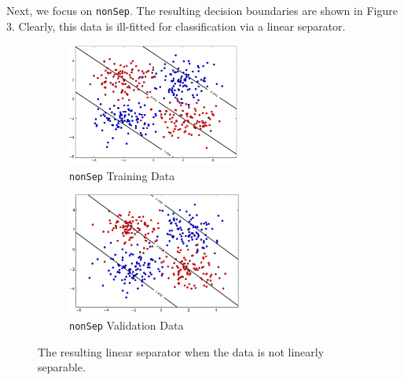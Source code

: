 \documentclass{sigchi}
\begin{document}
Next, we focus on \texttt{nonSep}. The resulting decision boundaries are shown in Figure 3. Clearly, this data is ill-fitted for classification via a linear separator.

\begin{figure}
\centering

\begin{subfigure}[b]{2.25in}
	\includegraphics[width = 2.25in]{plots/1-3/casey/nonSepc1train.png}
	\caption{\texttt{nonSep} Training Data}
\end{subfigure}

\begin{subfigure}[b]{2.25in}
	\includegraphics[width = 2.25in]{plots/1-3/casey/nonSepc1val.png}
	\caption{\texttt{nonSep} Validation Data}
\end{subfigure}
\caption{The resulting linear separator when the data is not linearly separable.}
\end{figure}
\end{document}
